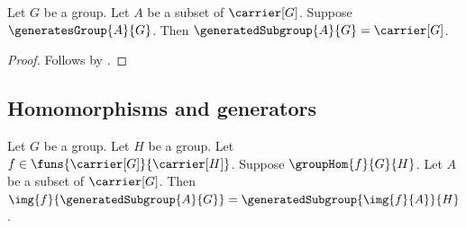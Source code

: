 \begin{proposition}\label{generates_group_equation}
    Let $G$ be a group.
    Let $A$ be a subset of $\carrier[G]$.
    Suppose $\generatesGroup{A}{G}$.
    Then $\generatedSubgroup{A}{G}=\carrier[G]$.
\end{proposition}
\begin{proof}
    Follows by .
\end{proof}

\subsection{Homomorphisms and generators}

\begin{theorem}\label{group_hom_image_generated_subgroup}
    Let $G$ be a group.
    Let $H$ be a group.
    Let $f\in\funs{\carrier[G]}{\carrier[H]}$.
    Suppose $\groupHom{f}{G}{H}$.
    Let $A$ be a subset of $\carrier[G]$.
    Then
        $\img{f}{\generatedSubgroup{A}{G}}=
            \generatedSubgroup{\img{f}{A}}{H}$.
\end{theorem}
